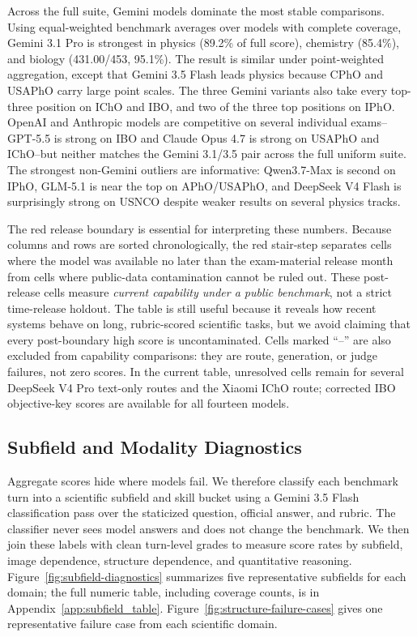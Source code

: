 \documentclass[11pt]{article}
\begin{document}
Across the full suite, Gemini models dominate the most stable comparisons.
Using equal-weighted benchmark averages over models with complete coverage, Gemini 3.1 Pro is strongest in physics (89.2\% of full score), chemistry (85.4\%), and biology (431.00/453, 95.1\%).
The result is similar under point-weighted aggregation, except that Gemini 3.5 Flash leads physics because CPhO and USAPhO carry large point scales.
The three Gemini variants also take every top-three position on IChO and IBO, and two of the three top positions on IPhO.
OpenAI and Anthropic models are competitive on several individual exams--GPT-5.5 is strong on IBO and Claude Opus 4.7 is strong on USAPhO and IChO--but neither matches the Gemini 3.1/3.5 pair across the full uniform suite.
The strongest non-Gemini outliers are informative: Qwen3.7-Max is second on IPhO, GLM-5.1 is near the top on APhO/USAPhO, and DeepSeek V4 Flash is surprisingly strong on USNCO despite weaker results on several physics tracks.

The red release boundary is essential for interpreting these numbers.
Because columns and rows are sorted chronologically, the red stair-step separates cells where the model was available no later than the exam-material release month from cells where public-data contamination cannot be ruled out.
These post-release cells measure \emph{current capability under a public benchmark}, not a strict time-release holdout.
The table is still useful because it reveals how recent systems behave on long, rubric-scored scientific tasks, but we avoid claiming that every post-boundary high score is uncontaminated.
Cells marked ``--'' are also excluded from capability comparisons: they are route, generation, or judge failures, not zero scores.
In the current table, unresolved cells remain for several DeepSeek V4 Pro text-only routes and the Xiaomi IChO route; corrected IBO objective-key scores are available for all fourteen models.

\subsection{Subfield and Modality Diagnostics}
Aggregate scores hide where models fail.
We therefore classify each benchmark turn into a scientific subfield and skill bucket using a Gemini 3.5 Flash classification pass over the staticized question, official answer, and rubric.
The classifier never sees model answers and does not change the benchmark.
We then join these labels with clean turn-level grades to measure score rates by subfield, image dependence, structure dependence, and quantitative reasoning.
Figure~\ref{fig:subfield-diagnostics} summarizes five representative subfields for each domain; the full numeric table, including coverage counts, is in Appendix~\ref{app:subfield_table}.
Figure~\ref{fig:structure-failure-cases} gives one representative failure case from each scientific domain.
\end{document}
